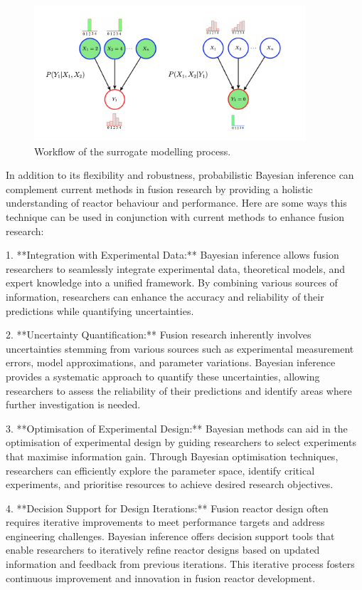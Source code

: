 \documentclass[journal]{IEEEtran}
\begin{document}
\begin{figure}[t]
    \centering
    \includegraphics[width=0.9\textwidth]{figures/inference_F&R_diagram.png}
    \caption{Workflow of the surrogate modelling process.}\label{fig:inference_F&R_diagram}
\end{figure}

In addition to its flexibility and robustness, probabilistic Bayesian inference can complement current methods in fusion research by providing a holistic understanding of reactor behaviour and performance. Here are some ways this technique can be used in conjunction with current methods to enhance fusion research:

1. **Integration with Experimental Data:** Bayesian inference allows fusion researchers to seamlessly integrate experimental data, theoretical models, and expert knowledge into a unified framework. By combining various sources of information, researchers can enhance the accuracy and reliability of their predictions while quantifying uncertainties.

2. **Uncertainty Quantification:** Fusion research inherently involves uncertainties stemming from various sources such as experimental measurement errors, model approximations, and parameter variations. Bayesian inference provides a systematic approach to quantify these uncertainties, allowing researchers to assess the reliability of their predictions and identify areas where further investigation is needed.

3. **Optimisation of Experimental Design:** Bayesian methods can aid in the optimisation of experimental design by guiding researchers to select experiments that maximise information gain. Through Bayesian optimisation techniques, researchers can efficiently explore the parameter space, identify critical experiments, and prioritise resources to achieve desired research objectives.

4. **Decision Support for Design Iterations:** Fusion reactor design often requires iterative improvements to meet performance targets and address engineering challenges. Bayesian inference offers decision support tools that enable researchers to iteratively refine reactor designs based on updated information and feedback from previous iterations. This iterative process fosters continuous improvement and innovation in fusion reactor development.
\end{document}
